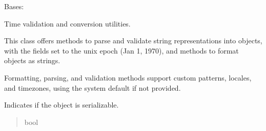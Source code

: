\documentclass[letterpaper,10pt,english]{sphinxmanual}
\begin{document}
\begin{fulllineitems}
\label{\detokenize{apache_commons_validator_python.routines:apache_commons_validator_python.routines.time_validator.TimeValidator}}
\pysigstartsignatures
{}
\pysigstopsignatures
\sphinxAtStartPar
Bases: 

\sphinxAtStartPar
Time validation and conversion utilities.

\sphinxAtStartPar
This class offers methods to parse and validate  string representations
into  objects, with the  fields set to the unix epoch (Jan 1, 1970),
and methods to format  objects as strings.

\sphinxAtStartPar
Formatting, parsing, and validation methods support custom patterns, locales, and timezones,
using the system default if not provided.

\begin{fulllineitems}
\label{\detokenize{apache_commons_validator_python.routines:apache_commons_validator_python.routines.time_validator.TimeValidator.serializable}}
\pysigstartsignatures
{}
\pysigstopsignatures
\sphinxAtStartPar
Indicates if the object is serializable.
\begin{quote}\begin{description}
\sphinxAtStartPar
bool

\end{description}\end{quote}

\end{fulllineitems}


\end{fulllineitems}
\end{document}
